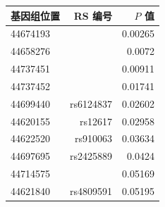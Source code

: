 \begin{table}[htbp]
\centering\small
{}
\begin{tabular}{lrr}
\toprule
基因组位置&RS 编号&$P$ 值\\
\midrule
44674193&&0.00265\\
44658276&&0.0072\\
44737451&&0.00911\\
44737452&&0.01741\\
44699440&rs6124837&0.02602\\
44620155&rs12617&0.02958\\
44622520&rs910063&0.03634\\
44697695&rs2425889&0.0424\\
44714575&&0.05169\\
44621840&rs4809591&0.05195\\
\bottomrule
\end{tabular}
\end{table}
